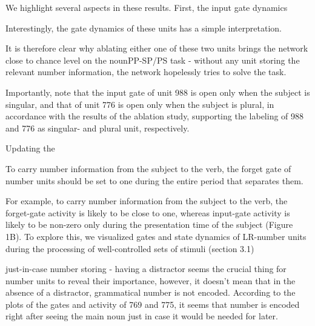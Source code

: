 We highlight several aspects in these results. First, the input gate dynamics 


Interestingly, the gate dynamics of these units has a simple interpretation. 

It is therefore clear why ablating either one of these two units brings the network close to chance level on the nounPP-SP/PS task - without any unit storing the relevant number information, the network hopelessly tries to solve the task.



Importantly, note that the input gate of unit 988 is open only when the subject is singular, and that of unit 776 is open only when the subject is plural, in accordance with the results of the ablation study, supporting the labeling of 988 and 776 as singular- and plural unit, respectively. 


Updating the 



To carry number information from the subject to the verb, the forget gate of number units should be set to one during the entire period that separates them. 

For example, to carry number information from the subject to the verb, the forget-gate activity is likely to be close to one, whereas input-gate activity is likely to be non-zero only during the presentation time of the subject (Figure 1B). To explore this, we visualized gates and state dynamics of LR-number units during the processing of well-controlled sets of stimuli (section 3.1)

just-in-case number storing - having a distractor seems the crucial thing for number units to reveal their importance, however, it doesn’t mean that in the  absence  of  a  distractor,  grammatical  number  is  not  encoded. According to the plots of the gates and activity of 769 and 775, it seems that number is encoded right after seeing the main noun just in case it would be needed for later.



\lipsum[1]

